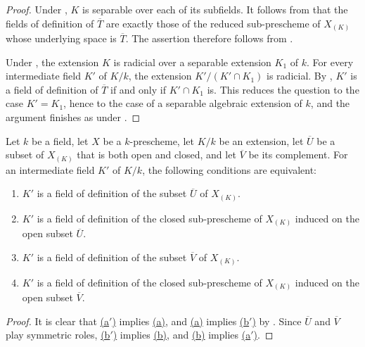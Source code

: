 \begin{proof}
Under , $K$ is separable over each of its
subfields.
It follows from  that the fields of definition of
$\overline T$ are exactly those of the reduced sub-prescheme of
$X_{(K)}$ whose underlying space is $\overline T$.
The assertion therefore follows from .

Under , the extension $K$ is radicial over a
separable extension $K_1$ of $k$.
For every intermediate field $K'$ of $K/k$, the extension
$K'/(K'\cap K_1)$ is radicial.
By , $K'$ is a field of definition of
$\overline T$ if and only if $K'\cap K_1$ is.
This reduces the question to the case $K'=K_1$, hence to the case of
a separable algebraic extension of $k$, and the argument finishes as
under .
\end{proof}

\begin{proposition}[4.9.6]
\label{IV.4.9.6}
Let $k$ be a field, let $X$ be a $k$-prescheme, let $K/k$ be an
extension, let $\overline U$ be a subset of $X_{(K)}$ that is both
open and closed, and let $\overline V$ be its complement.
For an intermediate field $K'$ of $K/k$, the following conditions
are equivalent:
\begin{enumerate}
\item[\rm(a)]
\label{IV.4.9.6.a}
$K'$ is a field of definition of the subset $\overline U$ of
$X_{(K)}$.
\item[\rm(a$'$)]
\label{IV.4.9.6.aprime}
$K'$ is a field of definition of the closed sub-prescheme of
$X_{(K)}$ induced on the open subset $\overline U$.
\item[\rm(b)]
\label{IV.4.9.6.b}
$K'$ is a field of definition of the subset $\overline V$ of
$X_{(K)}$.
\item[\rm(b$'$)]
\label{IV.4.9.6.bprime}
$K'$ is a field of definition of the closed sub-prescheme of
$X_{(K)}$ induced on the open subset $\overline V$.
\end{enumerate}
\end{proposition}

\begin{proof}
It is clear that
{\hyperlink{ega4.c04.sec.4-9-6-aprime}{(a$'$)}} implies
{\hyperlink{ega4.c04.sec.4-9-6-a}{(a)}}, and
{\hyperlink{ega4.c04.sec.4-9-6-a}{(a)}} implies
{\hyperlink{ega4.c04.sec.4-9-6-bprime}{(b$'$)}} by .
Since $\overline U$ and $\overline V$ play symmetric roles,
{\hyperlink{ega4.c04.sec.4-9-6-bprime}{(b$'$)}} implies
{\hyperlink{ega4.c04.sec.4-9-6-b}{(b)}}, and
{\hyperlink{ega4.c04.sec.4-9-6-b}{(b)}} implies
{\hyperlink{ega4.c04.sec.4-9-6-aprime}{(a$'$)}}.
\end{proof}

